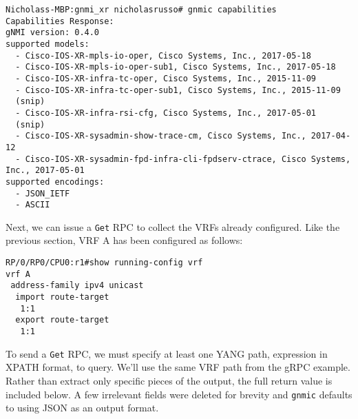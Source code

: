 \begin{verbatim}
Nicholass-MBP:gnmi_xr nicholasrusso# gnmic capabilities
Capabilities Response:
gNMI version: 0.4.0
supported models:
  - Cisco-IOS-XR-mpls-io-oper, Cisco Systems, Inc., 2017-05-18
  - Cisco-IOS-XR-mpls-io-oper-sub1, Cisco Systems, Inc., 2017-05-18
  - Cisco-IOS-XR-infra-tc-oper, Cisco Systems, Inc., 2015-11-09
  - Cisco-IOS-XR-infra-tc-oper-sub1, Cisco Systems, Inc., 2015-11-09
  (snip)
  - Cisco-IOS-XR-infra-rsi-cfg, Cisco Systems, Inc., 2017-05-01
  (snip)
  - Cisco-IOS-XR-sysadmin-show-trace-cm, Cisco Systems, Inc., 2017-04-12
  - Cisco-IOS-XR-sysadmin-fpd-infra-cli-fpdserv-ctrace, Cisco Systems, Inc., 2017-05-01
supported encodings:
  - JSON_IETF
  - ASCII
\end{verbatim}

Next, we can issue a \verb|Get| RPC to collect the VRFs already configured.
Like the previous section, VRF A has been configured as follows:

\begin{verbatim}
RP/0/RP0/CPU0:r1#show running-config vrf
vrf A
 address-family ipv4 unicast
  import route-target
   1:1
  export route-target
   1:1
\end{verbatim}

To send a \verb|Get| RPC, we must specify at least one YANG path, expression
in XPATH format, to query. We'll use the same VRF path from the gRPC example.
Rather than extract only specific pieces of the output, the full return value
is included below. A few irrelevant fields were deleted for brevity and
\verb|gnmic| defaults to using JSON as an output format.

